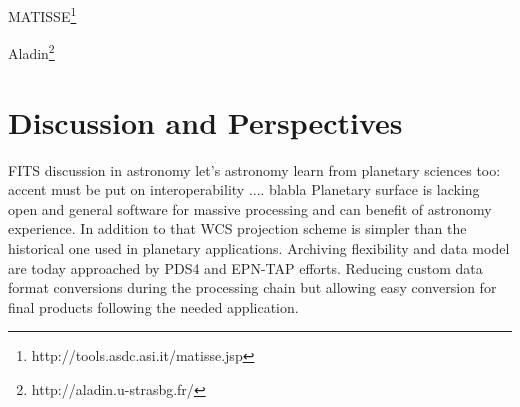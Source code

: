 MATISSE\footnote{http://tools.asdc.asi.it/matisse.jsp} \citep{ZINZI2016}

Aladin\footnote{http://aladin.u-strasbg.fr/}

\section{Discussion and Perspectives}
\label{sec:disc}
FITS discussion in astronomy\citep{THOMAS2015133} 
let's astronomy learn from planetary sciences too: accent must be put on interoperability
.... blabla
Planetary surface is lacking open and general software for massive processing and can benefit
of astronomy experience. In addition to that WCS projection scheme is simpler than the
historical one used in planetary applications. 
Archiving flexibility and data model are today approached by PDS4 and EPN-TAP efforts.
Reducing custom data format conversions during the processing chain but
allowing easy conversion for final products following the needed application.


%
%
%


%
%

%

